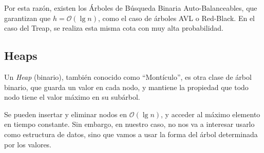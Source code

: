 Por esta razón, existen los Árboles de Búsqueda Binaria Auto-Balanceables,
que garantizan que \(h = \mathcal{O}(\lg n)\), como el caso de árboles AVL o Red-Black.
En el caso del Treap, se realiza esta misma cota con muy alta probabilidad.

\subsection{Heaps}

Un \textit{Heap} (binario), también conocido como ``Montículo'', es otra clase de árbol binario,
que guarda un valor en cada nodo, y mantiene la propiedad que todo nodo tiene
el valor máximo en su subárbol.



Se pueden insertar y eliminar nodos en $\mathcal{O}(\lg n)$, y acceder al máximo elemento en tiempo constante.
Sin embargo, en nuestro caso, no nos va a interesar usarlo como estructura de datos,
sino que vamos a usar la forma del árbol determinada por los valores.